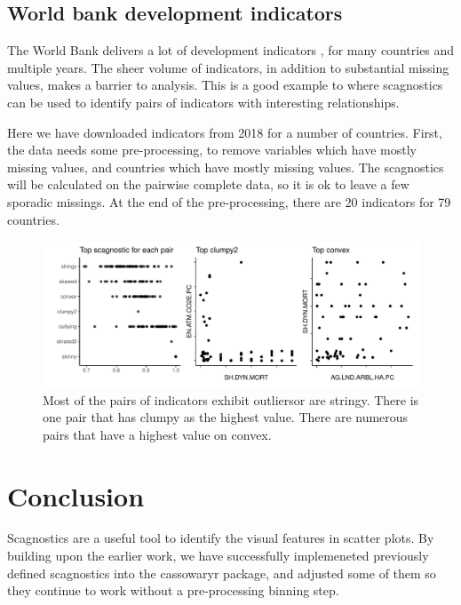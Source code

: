 \hypertarget{world-bank-development-indicators}{%
\subsection{World bank development
indicators}\label{world-bank-development-indicators}}

The World Bank delivers a lot of development indicators \citep{WBI}, for
many countries and multiple years. The sheer volume of indicators, in
addition to substantial missing values, makes a barrier to analysis.
This is a good example to where scagnostics can be used to identify
pairs of indicators with interesting relationships.

Here we have downloaded indicators from 2018 for a number of countries.
First, the data needs some pre-processing, to remove variables which
have mostly missing values, and countries which have mostly missing
values. The scagnostics will be calculated on the pairwise complete
data, so it is ok to leave a few sporadic missings. At the end of the
pre-processing, there are 20 indicators for 79 countries.

\begin{Schunk}
\begin{figure}
\includegraphics[width=1\linewidth]{mason-lee-laa-cook_files/figure-latex/wbistatic-1} \caption[Most of the pairs of indicators exhibit outliersor are stringy]{Most of the pairs of indicators exhibit outliersor are stringy. There is one pair that has clumpy as the highest value. There are numerous pairs that have a highest value on convex.}\label{fig:wbistatic}
\end{figure}
\end{Schunk}

\hypertarget{conclusion}{%
\section{Conclusion}\label{conclusion}}

Scagnostics are a useful tool to identify the visual features in scatter
plots. By building upon the earlier work, we have successfully
implemeneted previously defined scagnostics into the cassowaryr package,
and adjusted some of them so they continue to work without a
pre-processing binning step.

